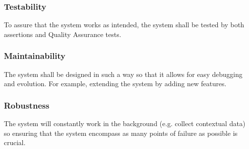         \subsubsection{Testability}
        To assure that the system works as intended, the system shall be tested by both assertions and Quality Assurance tests. 
        
        \subsubsection{Maintainability}
        The system shall be designed in such a way so that it allows for easy debugging and evolution. For example, extending the system by adding new features.
        
        \subsubsection{Robustness}
        The system will constantly work in the background (e.g. collect contextual data) so ensuring that the system encompass as many points of failure as possible is crucial.
    
    
    